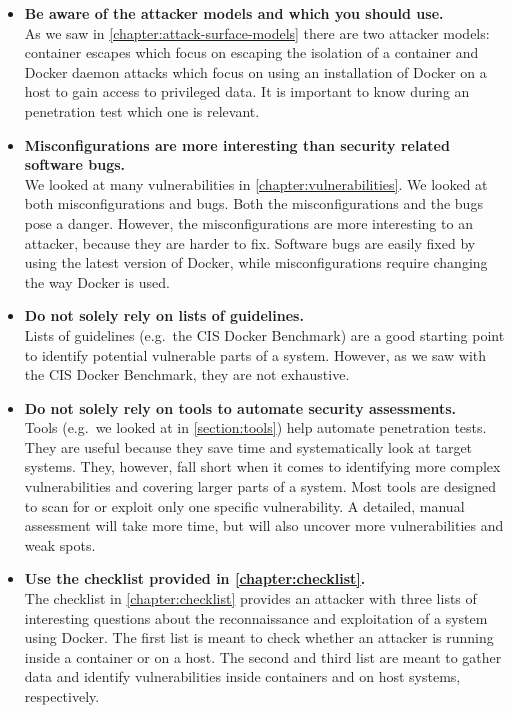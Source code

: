 \begin{itemize}
    \item \textbf{Be aware of the attacker models and which you should use.}\\
        As we saw in \autoref{chapter:attack-surface-models} there are two attacker models: container escapes which focus on escaping the isolation of a container and Docker daemon attacks which focus on using an installation of Docker on a host to gain access to privileged data. It is important to know during an penetration test which one is relevant.

    \item \textbf{Misconfigurations are more interesting than security related software bugs.}\\
        We looked at many vulnerabilities in \autoref{chapter:vulnerabilities}. We looked at both misconfigurations and bugs. Both the misconfigurations and the bugs pose a danger. However, the misconfigurations are more interesting to an attacker, because they are harder to fix. Software bugs are easily fixed by using the latest version of Docker, while misconfigurations require changing the way Docker is used.

    \item \textbf{Do not solely rely on lists of guidelines.}\\
        Lists of guidelines (e.g.\ the CIS Docker Benchmark) are a good starting point to identify potential vulnerable parts of a system. However, as we saw with the CIS Docker Benchmark, they are not exhaustive.

    \item \textbf{Do not solely rely on tools to automate security assessments.}\\
        Tools (e.g.\ we looked at in \autoref{section:tools}) help automate penetration tests. They are useful because they save time and systematically look at target systems. They, however, fall short when it comes to identifying more complex vulnerabilities and covering larger parts of a system. Most tools are designed to scan for or exploit only one specific vulnerability. A detailed, manual assessment will take more time, but will also uncover more vulnerabilities and weak spots.

    \item \textbf{Use the checklist provided in \autoref{chapter:checklist}.}\\
        The checklist in \autoref{chapter:checklist} provides an attacker with three lists of interesting questions about the reconnaissance and exploitation of a system using Docker. The first list is meant to check whether an attacker is running inside a container or on a host. The second and third list are meant to gather data and identify vulnerabilities inside containers and on host systems, respectively.
\end{itemize}

